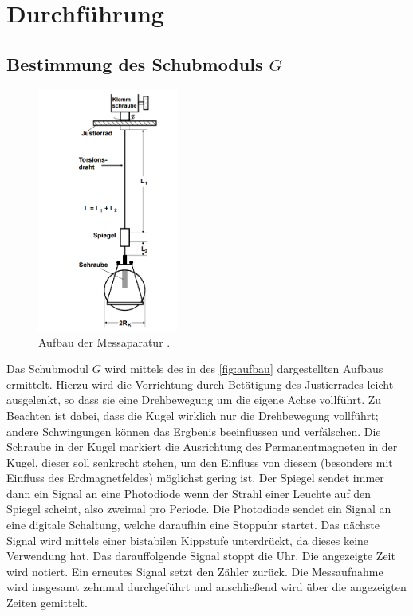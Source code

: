 \section{Durchführung}
\label{sec:Durchführung}
\subsection{Bestimmung des Schubmoduls $G$}
    \begin{figure}
        \centering
        \includegraphics[height=8cm]{content/aufbau.png}
        \caption{Aufbau der Messaparatur \cite[100]{V102}.}
        \label{fig:aufbau}
    \end{figure}
    Das Schubmodul $G$ wird mittels des in des \autoref{fig:aufbau} dargestellten Aufbaus ermittelt.
    Hierzu wird die Vorrichtung durch Betätigung des Justierrades leicht ausgelenkt, so dass sie eine Drehbewegung um die eigene
    Achse vollführt. Zu Beachten ist dabei, dass die Kugel wirklich nur die Drehbewegung vollführt; andere Schwingungen können
    das Ergbenis beeinflussen und verfälschen.
    Die Schraube in der Kugel markiert die Ausrichtung des Permanentmagneten in der Kugel, dieser soll senkrecht stehen, um den
    Einfluss von diesem (besonders mit Einfluss des Erdmagnetfeldes) möglichst gering ist.
    Der Spiegel sendet immer dann ein Signal an eine Photodiode wenn der Strahl einer Leuchte auf den Spiegel scheint, also zweimal pro
    Periode. Die Photodiode sendet ein Signal an eine digitale Schaltung, welche daraufhin eine Stoppuhr startet. Das nächste Signal 
    wird mittels einer bistabilen Kippstufe unterdrückt, da dieses keine Verwendung hat. Das darauffolgende Signal stoppt die Uhr.
    Die angezeigte Zeit wird notiert. Ein erneutes Signal setzt den Zähler zurück. Die Messaufnahme wird insgesamt zehnmal durchgeführt
    und anschließend wird über die angezeigten Zeiten gemittelt.
